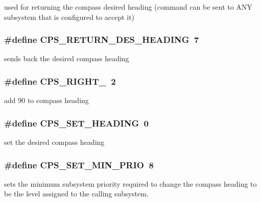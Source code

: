 used for returning the compass desired heading (command can be sent to A\-N\-Y subsystem that is configured to accept it) \hypertarget{group__compass__commands_gaa446e15281de94b24f27a8464025c20d}{
\subsubsection[{C\-P\-S\-\_\-\-R\-E\-T\-U\-R\-N\-\_\-\-D\-E\-S\-\_\-\-H\-E\-A\-D\-I\-N\-G}]{\setlength{\rightskip}{0pt plus 5cm}\#define C\-P\-S\-\_\-\-R\-E\-T\-U\-R\-N\-\_\-\-D\-E\-S\-\_\-\-H\-E\-A\-D\-I\-N\-G~7}}\label{group__compass__commands_gaa446e15281de94b24f27a8464025c20d}
sends back the desired compass heading \hypertarget{group__compass__commands_ga53ccdcb9ce75af6b95e56476367d2875}{
\subsubsection[{C\-P\-S\-\_\-\-R\-I\-G\-H\-T\-\_\-90}]{\setlength{\rightskip}{0pt plus 5cm}\#define C\-P\-S\-\_\-\-R\-I\-G\-H\-T\-\_~2}}\label{group__compass__commands_ga53ccdcb9ce75af6b95e56476367d2875}
add 90 to compass heading \hypertarget{group__compass__commands_ga10dbf50964cb04b6648e3b65502c0ff4}{
\subsubsection[{C\-P\-S\-\_\-\-S\-E\-T\-\_\-\-H\-E\-A\-D\-I\-N\-G}]{\setlength{\rightskip}{0pt plus 5cm}\#define C\-P\-S\-\_\-\-S\-E\-T\-\_\-\-H\-E\-A\-D\-I\-N\-G~0}}\label{group__compass__commands_ga10dbf50964cb04b6648e3b65502c0ff4}
set the desired compass heading \hypertarget{group__compass__commands_gaced5bbf2a229241444bd738fac5f6ba3}{
\subsubsection[{C\-P\-S\-\_\-\-S\-E\-T\-\_\-\-M\-I\-N\-\_\-\-P\-R\-I\-O}]{\setlength{\rightskip}{0pt plus 5cm}\#define C\-P\-S\-\_\-\-S\-E\-T\-\_\-\-M\-I\-N\-\_\-\-P\-R\-I\-O~8}}\label{group__compass__commands_gaced5bbf2a229241444bd738fac5f6ba3}
sets the minimum subsystem priority required to change the compass heading to be the level assigned to the calling subsystem. 